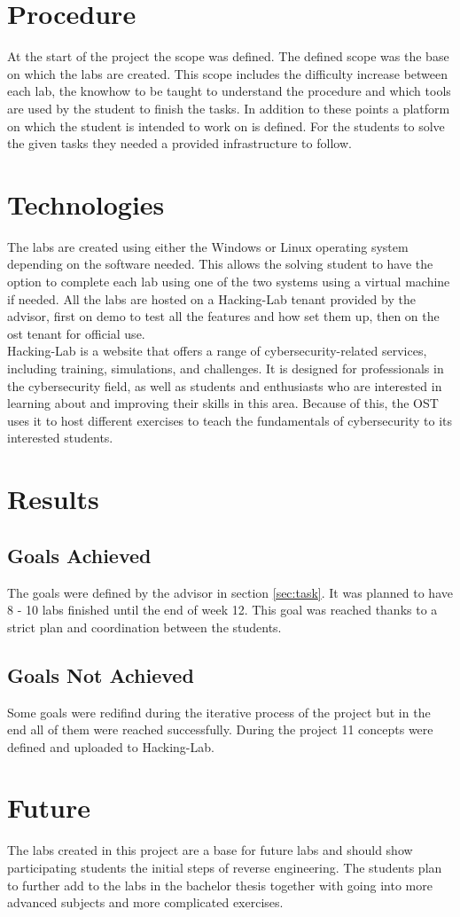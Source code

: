\section{Procedure}
At the start of the project the scope was defined. The defined scope was the base on which the labs are created. This scope includes the difficulty increase between each lab, the knowhow to be taught to understand the procedure and which tools are used by the student to finish the tasks. In addition to these points a platform on which the student is intended to work on is defined.
For the students to solve the given tasks they needed a provided infrastructure to follow.

\section{Technologies}
The labs are created using either the Windows or Linux operating system depending on the software needed. This allows the solving student to have the option to complete each lab using one of the two systems using a virtual machine if needed. 
All the labs are hosted on a Hacking-Lab tenant provided by the advisor, first on demo to test all the features and how set them up, then on the ost tenant for official use. \\
Hacking-Lab is a website that offers a range of cybersecurity-related services, including training, simulations, and challenges. It is designed for professionals in the cybersecurity field, as well as students and enthusiasts who are interested in learning about and improving their skills in this area.
Because of this, the OST uses it to host different exercises to teach the fundamentals of cybersecurity to its interested students.

\section{Results}
\subsection{Goals Achieved}
The goals were defined by the advisor in section \ref{sec:task}. It was planned to have 8 - 10 labs finished until the end of week 12. This goal was reached thanks to a strict plan and coordination between the students.

\subsection{Goals Not Achieved}
Some goals were redifind during the iterative process of the project but in the end all of them were reached successfully. During the project 11 concepts were defined and uploaded to Hacking-Lab.

\section{Future}
The labs created in this project are a base for future labs and should show participating students the initial steps of reverse engineering. The students plan to further add to the labs in the bachelor thesis together with going into more advanced subjects and more complicated exercises. 
